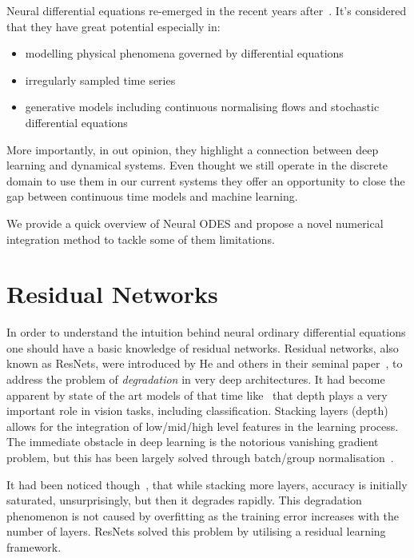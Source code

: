 \documentclass[11pt]{report}
\begin{document}
    Neural differential equations re-emerged in the recent years after~\cite{chen2018neural}.
    It's considered that they have great potential especially in:
    \begin{itemize}
        \item modelling physical phenomena governed by differential equations
        \item irregularly sampled time series
        \item generative models including continuous normalising flows and stochastic differential equations
    \end{itemize}
    More importantly, in out opinion, they highlight a connection between deep learning and dynamical systems.
    Even thought we still operate in the discrete domain to use them in our current systems they offer an opportunity
    to close the gap between continuous time models and machine learning.

    We provide a quick overview of Neural ODES and propose a novel numerical integration method to tackle some of
    them limitations.


    \chapter{Residual Networks} \label{ch:resnet}
    In order to understand the intuition behind neural ordinary differential equations one should have a basic knowledge
    of residual networks.
    Residual networks, also known as ResNets, were introduced by He and others in their seminal
    paper~\cite{He_2016_CVPR}, to address the problem of \textit{degradation} in very deep architectures.
    It had become apparent by state of the art models of that time like~\cite{simonyan2014very} that depth plays a very
    important role in vision tasks, including classification.
    Stacking layers (depth) allows for the integration of low/mid/high level features in the learning process.
    The immediate obstacle in deep learning is the notorious vanishing gradient problem, but this has been largely
    solved through batch/group normalisation~\cite{ioffe2015batch}.

    It had been noticed though~\cite{srivastava2015highway}, that while stacking more layers, accuracy is initially saturated, unsurprisingly, but then it degrades rapidly.
    This degradation phenomenon is not caused by overfitting as the training error increases with the number of layers.
    ResNets solved this problem by utilising a residual learning framework.
\end{document}

